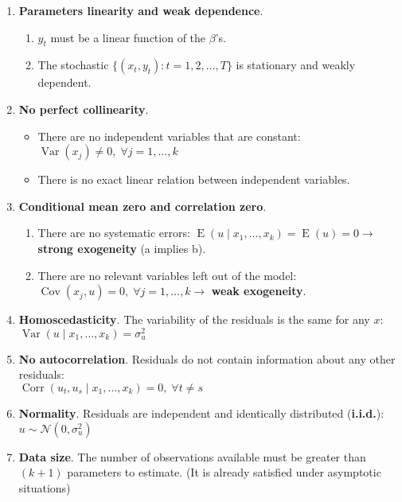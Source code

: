 \documentclass[10pt, a4paper, landscape]{article}
\DeclareMathOperator{\E}{E}
\DeclareMathOperator{\Var}{Var}
\DeclareMathOperator{\Cov}{Cov}
\DeclareMathOperator{\Corr}{Corr}
\begin{document}
\begin{multicols}{3}
\begin{enumerate}[leftmargin=*, label=t\arabic{*}.]
	\item \textbf{Parameters linearity and weak dependence}.
	\begin{enumerate}[leftmargin=*, label=\alph{*}.]
		\item \( y_{t} \) must be a linear function of the \( \beta \)'s.
		\item The stochastic \( \lbrace (x_{t}, y_{t}) : t = 1, 2, \ldots, T \rbrace \) is stationary and weakly dependent.
	\end{enumerate}
	\item \textbf{No perfect collinearity}.
	\begin{itemize}[leftmargin=*]
		\item There are no independent variables that are constant: \( \Var(x_{j}) \neq 0, \; \forall j = 1, \ldots, k \)
		\item There is no exact linear relation between independent variables.
	\end{itemize}
	\item \textbf{Conditional mean zero and correlation zero}.
	\begin{enumerate}[leftmargin=*, label=\alph{*}.]
		\item There are no systematic errors: \( \E(u \mid x_{1}, \ldots, x_{k}) = \E(u) = 0 \rightarrow \) \textbf{strong exogeneity} (a implies b).
		\item There are no relevant variables left out of the model: \( \Cov(x_{j} , u) = 0, \; \forall j = 1, \ldots, k \rightarrow \) \textbf{weak exogeneity}.
	\end{enumerate}
	\item \textbf{Homoscedasticity}. The variability of the residuals is the same for any \( x \): \( \Var(u \mid x_{1}, \ldots, x_{k}) = \sigma_{u}^{2} \)
	\item \textbf{No autocorrelation}. Residuals do not contain information about any other residuals: \\
	\( \Corr(u_{t}, u_{s} \mid x_{1}, \ldots, x_{k}) = 0, \; \forall t \neq s \)
	\item \textbf{Normality}. Residuals are independent and identically distributed (\textbf{i.i.d.}): \( u \sim \mathcal{N} (0, \sigma_{u}^{2}) \)
	\item \textbf{Data size}. The number of observations available must be greater than \( (k + 1) \) parameters to estimate. (It is already satisfied under asymptotic situations)
\end{enumerate}


\end{multicols}
\end{document}
